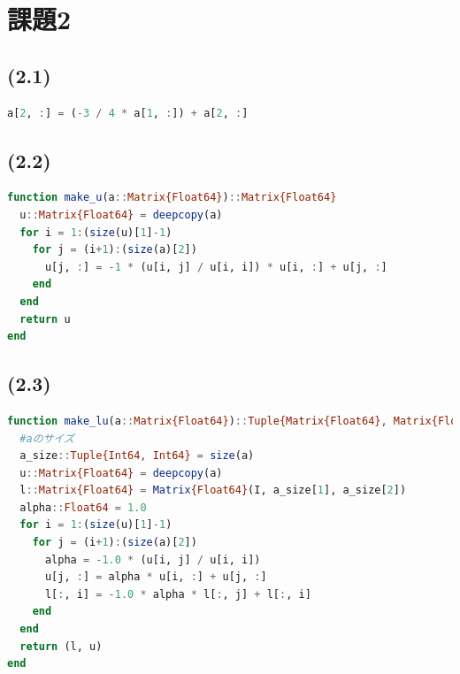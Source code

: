 \documentclass[uplatex, dvipdfmx, a4j,11pt]{jsarticle}
\begin{document}
\section*{課題2}
\subsection*{(2.1)}
\begin{lstlisting}[title={(2.1)}, label=code:in, language=Julia]
a[2, :] = (-3 / 4 * a[1, :]) + a[2, :]
\end{lstlisting}

\subsection*{(2.2)}
\begin{lstlisting}[title={(2.2)}, label=code:in, language=Julia]
function make_u(a::Matrix{Float64})::Matrix{Float64}
  u::Matrix{Float64} = deepcopy(a)
  for i = 1:(size(u)[1]-1)
    for j = (i+1):(size(a)[2])
      u[j, :] = -1 * (u[i, j] / u[i, i]) * u[i, :] + u[j, :]
    end
  end
  return u
end
\end{lstlisting}

\newpage
\subsection*{(2.3)}
\begin{lstlisting}[title={(2.3)}, label=code:in, language=Julia]
function make_lu(a::Matrix{Float64})::Tuple{Matrix{Float64}, Matrix{Float64}}
  #aのサイズ
  a_size::Tuple{Int64, Int64} = size(a)
  u::Matrix{Float64} = deepcopy(a)
  l::Matrix{Float64} = Matrix{Float64}(I, a_size[1], a_size[2])
  alpha::Float64 = 1.0
  for i = 1:(size(u)[1]-1)
    for j = (i+1):(size(a)[2])
      alpha = -1.0 * (u[i, j] / u[i, i])
      u[j, :] = alpha * u[i, :] + u[j, :]
      l[:, i] = -1.0 * alpha * l[:, j] + l[:, i]
    end
  end
  return (l, u)
end
\end{lstlisting}
\end{document}
